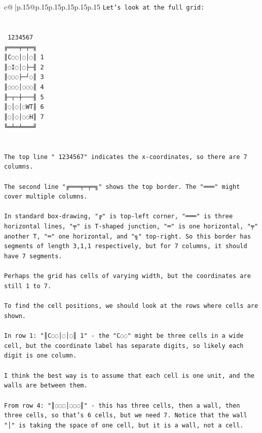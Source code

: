 \documentclass{article}
\begin{document}
{\begin{supertabular}{c@{$\;$}|p{.15\linewidth}@{}p{.15\linewidth}p{.15\linewidth}p{.15\linewidth}p{.15\linewidth}p{.15\linewidth}}
{{{\texttt{Let's look at the full grid:} \\
\\ 
\\ 
\texttt{ 1234567} \\
\texttt{╔═══╤═╤═╗} \\
\texttt{║C◌◌│◌│◌║ 1} \\
\texttt{║◌I◌│◌├─╢ 2} \\
\texttt{║◌◌◌├─┘◌║ 3} \\
\texttt{║◌◌◌│◌◌◌║ 4} \\
\texttt{╟─┬─┼───╢ 5} \\
\texttt{║◌│◌│◌WT║ 6} \\
\texttt{║◌│◌│◌◌H║ 7} \\
\texttt{╚═╧═╧═══╝} \\
\\ 
\\ 
\texttt{The top line " 1234567" indicates the x{-}coordinates, so there are 7 columns.} \\
\\ 
\texttt{The second line "╔═══╤═╤═╗" shows the top border. The "═══" might cover multiple columns.} \\
\\ 
\texttt{In standard box{-}drawing, "╔" is top{-}left corner, "═══" is three horizontal lines, "╤" is T{-}shaped junction, "═" is one horizontal, "╤" another T, "═" one horizontal, and "╗" top{-}right. So this border has segments of length 3,1,1 respectively, but for 7 columns, it should have 7 segments.} \\
\\ 
\texttt{Perhaps the grid has cells of varying width, but the coordinates are still 1 to 7.} \\
\\ 
\texttt{To find the cell positions, we should look at the rows where cells are shown.} \\
\\ 
\texttt{In row 1: "║C◌◌│◌│◌║ 1" {-} the "C◌◌" might be three cells in a wide cell, but the coordinate label has separate digits, so likely each digit is one column.} \\
\\ 
\texttt{I think the best way is to assume that each cell is one unit, and the walls are between them.} \\
\\ 
\texttt{From row 4: "║◌◌◌│◌◌◌║" {-} this has three cells, then a wall, then three cells, so that's 6 cells, but we need 7. Notice that the wall "│" is taking the space of one cell, but it is a wall, not a cell.} \\
}}}
\end{supertabular}}
\end{document}
